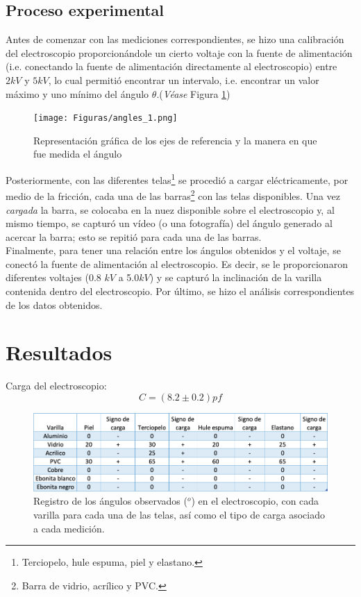 \documentclass[10pt,journal]{IEEEtran}
\begin{document}
\subsection{Proceso experimental}
Antes de comenzar con las mediciones correspondientes, se hizo una calibración del electroscopio proporcionándole un cierto voltaje con la fuente de alimentación (i.e. conectando la fuente de alimentación directamente al electroscopio) entre $2kV$ y $5kV$, lo cual permitió encontrar un intervalo, i.e. encontrar un valor máximo y uno mínimo del ángulo $\theta$.(\textit{Véase} Figura \ref{Fig: Angles})\\
\begin{figure}
\centering
\texttt{[image: Figuras/angles\_1.png]} 
\caption{Representación gráfica de los ejes de referencia y la manera en que fue medida el ángulo}
\label{Fig: Angles}
\end{figure}
Posteriormente, con las diferentes telas\footnote{Terciopelo, hule espuma, piel y elastano.} se procedió a cargar eléctricamente, por medio de la fricción, cada una de las barras\footnote{Barra de vidrio, acrílico y PVC.} con las telas disponibles. Una vez \textit{cargada} la barra, se colocaba en la nuez disponible sobre el electroscopio y, al mismo tiempo, se capturó un vídeo (o una fotografía) del ángulo generado al acercar la barra; esto se repitió para cada una de las barras.\\
Finalmente, para tener una relación entre los ángulos obtenidos y el voltaje, se conectó la fuente de alimentación al electroscopio. Es decir, se le proporcionaron diferentes voltajes (0.8 $kV$ a 5.0$kV$) y se capturó la inclinación de la varilla contenida dentro del electroscopio. Por último, se hizo el análisis correspondientes de los datos obtenidos.
\section{Resultados}

Carga del electroscopio:
\begin{equation*}
    C = (8.2 \pm 0.2)pf
\end{equation*}


\begin{figure}[H]
\centering
\includegraphics[scale=0.25]{tablasignos.png}
\caption{Registro de los ángulos observados ($^{o}$) en el electroscopio, con cada varilla para cada una de las telas, así como el tipo de carga asociado a cada medición.}
\end{figure}
\end{document}
